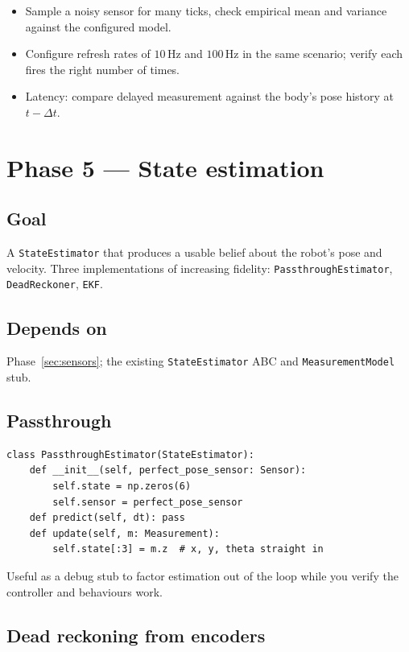 \documentclass[11pt,a4paper]{article}
\newcommand{\code}[1]{\texttt{\small #1}}
\begin{document}
\begin{itemize}
    \item Sample a noisy sensor for many ticks, check empirical mean and
        variance against the configured model.
    \item Configure refresh rates of $10\,\text{Hz}$ and $100\,\text{Hz}$
        in the same scenario; verify each fires the right number of times.
    \item Latency: compare delayed measurement against the body's pose
        history at $t - \Delta t$.
\end{itemize}

\section{Phase 5 --- State estimation}
\label{sec:estimator}

\subsection*{Goal}
A \code{StateEstimator} that produces a usable belief about the robot's
pose and velocity. Three implementations of increasing fidelity:
\code{PassthroughEstimator}, \code{DeadReckoner}, \code{EKF}.

\subsection*{Depends on}
Phase~\ref{sec:sensors}; the existing \code{StateEstimator} ABC and
\code{MeasurementModel} stub.

\subsection*{Passthrough}

\begin{lstlisting}
class PassthroughEstimator(StateEstimator):
    def __init__(self, perfect_pose_sensor: Sensor):
        self.state = np.zeros(6)
        self.sensor = perfect_pose_sensor
    def predict(self, dt): pass
    def update(self, m: Measurement):
        self.state[:3] = m.z  # x, y, theta straight in
\end{lstlisting}

Useful as a debug stub to factor estimation out of the loop while you
verify the controller and behaviours work.

\subsection*{Dead reckoning from encoders}
\end{document}
